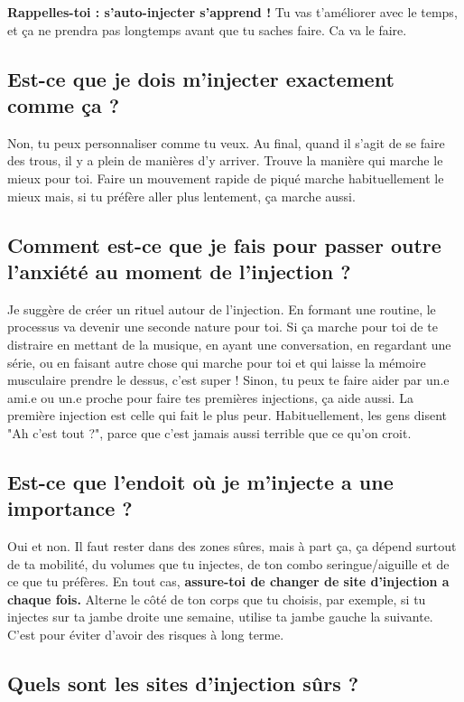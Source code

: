 \documentclass{article}
\begin{document}
\textbf{Rappelles-toi : s'auto-injecter s'apprend ! } Tu vas t'améliorer avec le temps, et ça ne prendra pas longtemps avant que tu saches faire. Ca va le faire.

\subsection{Est-ce que je dois m'injecter exactement comme ça ?}

Non, tu peux personnaliser comme tu veux. Au final, quand il s'agit de se faire des trous, il y a plein de manières d'y arriver. Trouve la manière qui marche le mieux pour toi. Faire un mouvement rapide de piqué marche habituellement le mieux mais, si tu préfère aller plus lentement, ça marche aussi.

\subsection{Comment est-ce que je fais pour passer outre l'anxiété au moment de l'injection ?}

Je suggère de créer un rituel autour de l'injection. En formant une routine, le processus va devenir une seconde nature pour toi. Si ça marche pour toi de te distraire en mettant de la musique, en ayant une conversation, en regardant une série, ou en faisant autre chose qui marche pour toi et qui laisse la mémoire musculaire prendre le dessus, c'est super ! Sinon, tu peux te faire aider par un.e ami.e ou un.e proche pour faire tes premières injections, ça aide aussi. La première injection est celle qui fait le plus peur. Habituellement, les gens disent "Ah c'est tout ?", parce que c'est jamais aussi terrible que ce qu'on croit.

\subsection{Est-ce que l'endoit où je m'injecte a une importance ?}

Oui et non. Il faut rester dans des zones sûres, mais à part ça, ça dépend surtout de ta mobilité, du volumes que tu injectes, de ton combo seringue/aiguille et de ce que tu préfères. En tout cas, \textbf{assure-toi de changer de site d'injection a chaque fois.} Alterne le côté de ton corps que tu choisis, par exemple, si tu injectes sur ta jambe droite une semaine, utilise ta jambe gauche la suivante. C'est pour éviter d'avoir des risques à long terme.

\subsection{Quels sont les sites d'injection sûrs ?}\label{5-5}
\end{document}

